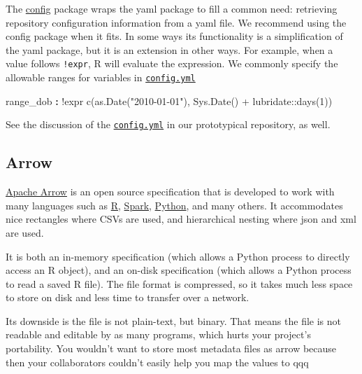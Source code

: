 \documentclass[
]{book}
\newenvironment{Shaded}{\begin{snugshade}}{\end{snugshade}}
\newcommand{\AttributeTok}[1]{\textcolor[rgb]{0.77,0.63,0.00}{#1}}
\newcommand{\FunctionTok}[1]{\textcolor[rgb]{0.00,0.00,0.00}{#1}}
\newcommand{\KeywordTok}[1]{\textcolor[rgb]{0.13,0.29,0.53}{\textbf{#1}}}
\begin{document}
The \href{https://github.com/rstudio/config}{config} package wraps the yaml package to fill a common need: retrieving repository configuration information from a yaml file. We recommend using the config package when it fits. In some ways its functionality is a simplification of the yaml package, but it is an extension in other ways. For example, when a value follows \texttt{!expr}, R will evaluate the expression. We commonly specify the allowable ranges for variables in \href{https://github.com/OuhscBbmc/cdw-skeleton-1/blob/master/config.yml}{\texttt{config.yml}}

\begin{Shaded}
\begin{Highlighting}[]
\FunctionTok{range\_dob   }\KeywordTok{:}\AttributeTok{ !expr c(as.Date("2010{-}01{-}01"), Sys.Date() + lubridate::days(1))}
\end{Highlighting}
\end{Shaded}

See the discussion of the \href{https://ouhscbbmc.github.io/data-science-practices-1/repo-prototype.html\#repo-config}{\texttt{config.yml}} in our prototypical repository, as well.

\hypertarget{data-containers-arrow}{%
\subsection{Arrow}\label{data-containers-arrow}}

\href{https://arrow.apache.org/}{Apache Arrow} is an open source specification that is developed to work with many languages such as \href{https://arrow.apache.org/docs/r/}{R}, \href{https://towardsdatascience.com/a-gentle-introduction-to-apache-arrow-with-apache-spark-and-pandas-bb19ffe0ddae}{Spark}, \href{https://spark.apache.org/docs/latest/sql-pyspark-pandas-with-arrow.html}{Python}, and many others. It accommodates nice rectangles where CSVs are used, and hierarchical nesting where json and xml are used.

It is both an in-memory specification (which allows a Python process to directly access an R object), and an on-disk specification (which allows a Python process to read a saved R file). The file format is compressed, so it takes much less space to store on disk and less time to transfer over a network.

Its downside is the file is not plain-text, but binary. That means the file is not readable and editable by as many programs, which hurts your project's portability. You wouldn't want to store most metadata files as arrow because then your collaborators couldn't easily help you map the values to qqq
\end{document}
